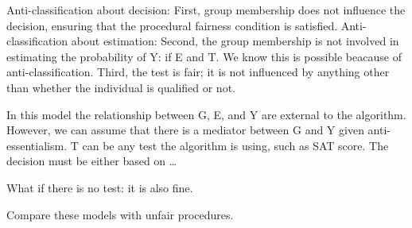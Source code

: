 \documentclass{article}
\begin{document}
Anti-classification about decision: 
First, group membership does not influence the decision, ensuring that the procedural fairness condition is satisfied.
Anti-classification about estimation: 
Second, the group membership is not involved in estimating the probability of Y: if E and T. We know this is possible beacause of anti-classification. 
Third, the test is fair; it is not influenced by anything other than whether the individual is qualified or not. 

In this model the relationship between G, E, and Y are external to the algorithm. However, we can assume that there is a mediator between G and Y given anti-essentialism. T can be any test the algorithm is using, such as SAT score. The decision must be either based on \dots

What if there is no test: it is also fine. 

Compare these models with unfair procedures. 

\setlength{\bibleftmargin}{.125in}
\setlength{\bibindent}{-\bibleftmargin}


\end{document}
